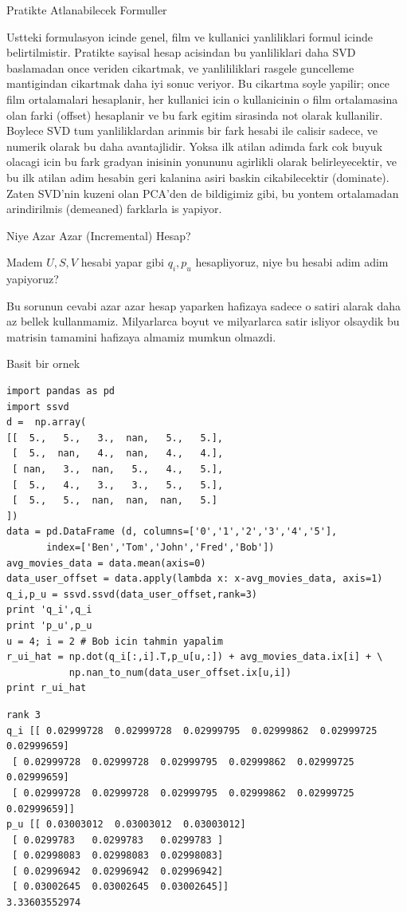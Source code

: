 \documentclass[12pt,fleqn]{article}\usepackage{../common}
\begin{document}
Pratikte Atlanabilecek Formuller

Ustteki formulasyon icinde genel, film ve kullanici yanliliklari formul
icinde belirtilmistir. Pratikte sayisal hesap acisindan bu yanliliklari
daha SVD baslamadan once veriden cikartmak, ve yanlililiklari rasgele
guncelleme mantigindan cikartmak daha iyi sonuc veriyor. Bu cikartma soyle
yapilir; once film ortalamalari hesaplanir, her kullanici icin o
kullanicinin o film ortalamasina olan farki (offset) hesaplanir ve bu fark
egitim sirasinda not olarak kullanilir. Boylece SVD tum yanliliklardan
arinmis bir fark hesabi ile calisir sadece, ve numerik olarak bu daha
avantajlidir. Yoksa ilk atilan adimda fark cok buyuk olacagi icin bu fark
gradyan inisinin yonununu agirlikli olarak belirleyecektir, ve bu ilk
atilan adim hesabin geri kalanina asiri baskin cikabilecektir
(dominate). Zaten SVD'nin kuzeni olan PCA'den de bildigimiz gibi, bu yontem
ortalamadan arindirilmis (demeaned) farklarla is yapiyor.

Niye Azar Azar (Incremental) Hesap? 

Madem $U,S,V$ hesabi yapar gibi $q_i,p_u$ hesapliyoruz, niye bu hesabi adim
adim yapiyoruz? 

Bu sorunun cevabi azar azar hesap yaparken hafizaya sadece o satiri alarak
daha az bellek kullanmamiz. Milyarlarca boyut ve milyarlarca satir isliyor
olsaydik bu matrisin tamamini hafizaya almamiz mumkun olmazdi. 

Basit bir ornek

\begin{verbatim}
import pandas as pd
import ssvd
d =  np.array(
[[  5.,   5.,   3.,  nan,   5.,   5.],
 [  5.,  nan,   4.,  nan,   4.,   4.],
 [ nan,   3.,  nan,   5.,   4.,   5.],
 [  5.,   4.,   3.,   3.,   5.,   5.],
 [  5.,   5.,  nan,  nan,  nan,   5.]
])
data = pd.DataFrame (d, columns=['0','1','2','3','4','5'],
       index=['Ben','Tom','John','Fred','Bob'])
avg_movies_data = data.mean(axis=0)
data_user_offset = data.apply(lambda x: x-avg_movies_data, axis=1)
q_i,p_u = ssvd.ssvd(data_user_offset,rank=3)
print 'q_i',q_i
print 'p_u',p_u
u = 4; i = 2 # Bob icin tahmin yapalim
r_ui_hat = np.dot(q_i[:,i].T,p_u[u,:]) + avg_movies_data.ix[i] + \
           np.nan_to_num(data_user_offset.ix[u,i])
print r_ui_hat
\end{verbatim}

\begin{verbatim}
rank 3
q_i [[ 0.02999728  0.02999728  0.02999795  0.02999862  0.02999725  0.02999659]
 [ 0.02999728  0.02999728  0.02999795  0.02999862  0.02999725  0.02999659]
 [ 0.02999728  0.02999728  0.02999795  0.02999862  0.02999725  0.02999659]]
p_u [[ 0.03003012  0.03003012  0.03003012]
 [ 0.0299783   0.0299783   0.0299783 ]
 [ 0.02998083  0.02998083  0.02998083]
 [ 0.02996942  0.02996942  0.02996942]
 [ 0.03002645  0.03002645  0.03002645]]
3.33603552974
\end{verbatim}
\end{document}
